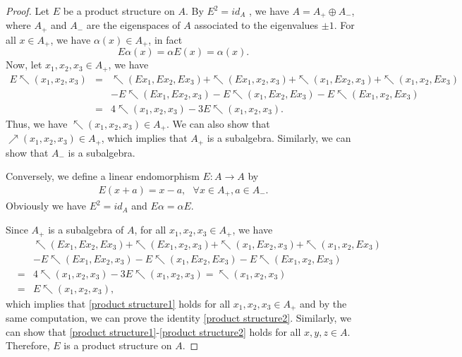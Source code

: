 \documentclass[a4paper,11pt]{article}
\def\a{\alpha}
\def\nw{\nwarrow}
\def\ne{\nearrow}
\theoremstyle{definition}
\begin{document}
\begin{proof}

Let $E$ be a product structure on $ A$. By $E^2=id_A$ , we have $ A= A_+\oplus A_-$, where $ A_+$ and $ A_-$ are the eigenspaces of $ A$ associated to the eigenvalues $\pm1$. For all $x\in A_+$, we have $\a(x)\in A_+$, in fact
$$E\a(x)=\a E(x)=\a(x).$$
Now, let $x_1,x_2,x_3\in A_+$, we have
\begin{eqnarray*}
E\nw(x_1,x_2,x_3)&=&\nw(Ex_1,Ex_2,Ex_3)+\nw(Ex_1,x_2,x_3)+\nw(x_1,Ex_2,x_3)+\nw(x_1,x_2,Ex_3)\\
&&-E\nw(Ex_1,Ex_2,x_3)-E\nw(x_1,Ex_2,Ex_3)-E\nw(Ex_1,x_2,Ex_3)\\
&=&4\nw(x_1,x_2,x_3)-3E\nw(x_1,x_2,x_3).
\end{eqnarray*}
Thus, we have $\nw(x_1,x_2,x_3)\in A_{+}$. We can also show that $\ne(x_1,x_2,x_3)\in A_{+}$, which implies that $ A_+$ is a subalgebra. Similarly, we can show that $ A_-$ is a subalgebra.


Conversely, we define a linear endomorphism $E: A\to A$ by
\begin{eqnarray}\label{eq:productE}
E(x+a)=x-a,\,\,\,\,\forall x\in A_+,a\in A_-.
\end{eqnarray}
Obviously we have $E^2=id_A$ and $E\a=\a E$.

Since $ A_+$ is a subalgebra of $ A$, for all $x_1,x_2,x_3\in A_+$, we have
\begin{eqnarray*}
&&\nw(Ex_1,Ex_2,Ex_3)+\nw(Ex_1,x_2,x_3)+\nw(x_1,Ex_2,x_3)+\nw(x_1,x_2,Ex_3)\\
&&-E\nw(Ex_1,Ex_2,x_3)-E\nw(x_1,Ex_2,Ex_3)-E\nw(Ex_1,x_2,Ex_3)\\
&=&4\nw(x_1,x_2,x_3)-3E\nw(x_1,x_2,x_3)=\nw(x_1,x_2,x_3)\\
&=&E\nw(x_1,x_2,x_3),
\end{eqnarray*}
which implies that \eqref{product structure1} holds for all $x_1,x_2,x_3\in A_+$ and by the same computation, we can prove the identity \eqref{product structure2}. Similarly, we can show that \eqref{product structure1}-\eqref{product structure2} holds for all $x,y,z\in A$.
Therefore,   $E$ is a product structure on $ A$.  \end{proof}
\end{document}
